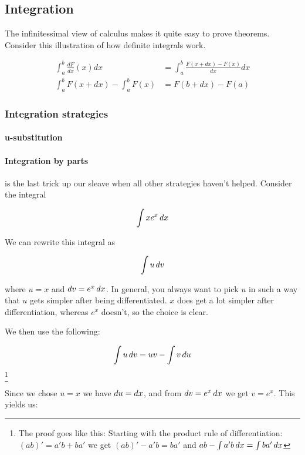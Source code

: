 \subsection{Integration}

The infinitessimal view of calculus makes it quite easy to prove theorems. Consider this illustration of how definite integrals work.

\begin{equation}
    \begin{aligned}
        \int_a^b \frac{dF}{dx}(x) dx &= \int_a^b \frac{F(x + dx) - F(x)}{dx} dx \\
        \int_a^b F(x + dx) - \int_a^b F(x) &= F(b + dx) - F(a)
    \end{aligned}
\end{equation}


\subsubsection{Integration strategies}

\paragraph{u-substitution}

\paragraph{Integration by parts} is the last trick up our sleave when all other strategies haven't helped. Consider the integral 

$$ \int x e^x \mathop{dx} $$

We can rewrite this integral as 

$$ \int u \mathop{dv} $$

where $u = x$ and $\mathop{dv} = e^x \mathop{dx}$. In general, you always want to pick $u$ in such a way that $u$ gets simpler after being differentiated.
$x$ does get a lot simpler after differentiation, whereas $e^x$ doesn't, so the choice is clear. 

We then use the following: 

$$ \int u \mathop{dv} = uv - \int v \mathop{du} $$\footnote{The proof goes like this: Starting with the product rule of differentiation: $(ab)' = a'b + ba'$ we get $(ab)' - a'b = ba'$ and  $ab - \int a'b \mathop{dx} = \int ba' \mathop{dx} $}

Since we chose $u = x$ we have $\mathop{du} = \mathop{dx}$, and from $\mathop{dv} = e^x \mathop{dx}$ we get $v = e^x$. This yields us: 

